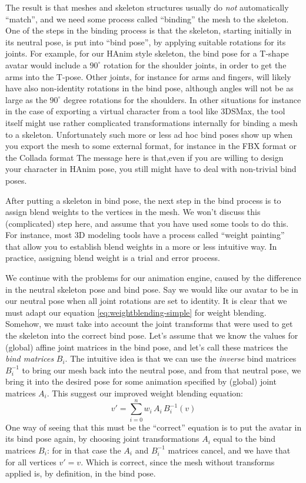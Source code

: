 The result is that meshes and skeleton structures usually do \emph{not} automatically ``match'', and we need some
process called ``binding'' the mesh to the skeleton. One of the steps in the binding process is
that the skeleton, starting initially in its neutral pose, is put into ``bind pose'', by applying suitable
rotations for its joints. For example, for our HAnim style skeleton, the bind pose for a T-shape avatar
would include a $90^\circ$ rotation for the shoulder joints, in order to get the arms into the T-pose.
Other joints, for instance for arms and fingers, will likely have also non-identity
rotations in the bind pose, although angles will not be as large as the $90^\circ$ degree rotations for the shoulders.
In other situations for instance in the case of exporting a virtual character from a tool like 3DSMax, the
tool itself might use rather complicated transformations internally for binding a mesh to a skeleton.
Unfortunately such more or less ad hoc bind poses show up when you export the mesh to some external format,
for instance in the FBX format or the Collada format
The message here is that,even if you are willing to design your character in HAnim pose,
you still might have to deal with non-trivial bind poses.

After putting a skeleton in bind pose,
the next step in the bind process is to assign blend weights to the vertices in the mesh.
We won't discuss this (complicated) step here, and assume that you have used some tools to do this.
For instance,  most 3D modeling tools have a process called ``weight painting'' that allow you to establish blend weights
in a more or less intuitive way. In practice, assigning blend weight is a trial and error process.

We continue with the problems for our animation engine,
caused by the difference in the neutral skeleton pose and bind pose.
Say we would like our avatar to be in our neutral pose when all joint rotations
are set to identity.
It is clear that we must adapt our equation \ref{eq:weightblending-simple}
for weight blending.
Somehow, we must take into account the joint transforms that were used to
get the skeleton into the correct bind pose. Let's assume that we know the values for (global) affine joint matrices
in the bind pose, and let's call these matrices the \emph{bind matrices} $B_i$.
The intuitive idea is that we can use the \emph{inverse} bind matrices $B_i^{-1}$ to bring our mesh
back into the neutral pose, and from that neutral pose, we bring it into the desired pose for some animation
specified by (global) joint matrices $A_i$.
This suggest our improved weight blending equation:
%
\begin{equation}\label{eq:weightblending}
 v' = \sum_{i=0}^{n} w_i\, A_i\,B_i^{-1}(v)
\end{equation}
%
One way of seeing that this must be the ``correct'' equation is to put the avatar in its bind pose again,
 by choosing joint transformations $A_i$ equal to the bind matrices $B_i$:
 for in that case the $A_i$ and $B_i^{-1}$ matrices cancel,
and we have that for all vertices $v' = v$. Which is correct, since the mesh without transforms applied is,
by definition, in the bind pose.

